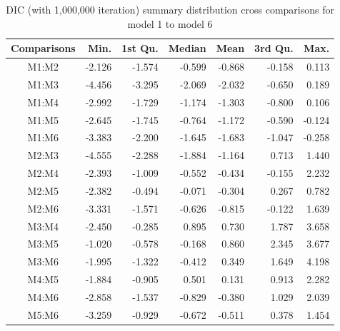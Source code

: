 \begin{table}[ht]
	\centering
	\begin{tabular}{crrrrrr}
		\hline
		Comparisons & Min. & 1st Qu. & Median & Mean & 3rd Qu. & Max. \\ 
		\hline
		M1:M2 & -2.126 & -1.574 & -0.599 & -0.868 & -0.158 & 0.113 \\ 
		M1:M3 & -4.456 & -3.295 & -2.069 & -2.032 & -0.650 & 0.189 \\ 
		M1:M4 & -2.992 & -1.729 & -1.174 & -1.303 & -0.800 & 0.106 \\ 
		M1:M5 & -2.645 & -1.745 & -0.764 & -1.172 & -0.590 & -0.124 \\ 
		M1:M6 & -3.383 & -2.200 & -1.645 & -1.683 & -1.047 & -0.258 \\ 
		M2:M3 & -4.555 & -2.288 & -1.884 & -1.164 & 0.713 & 1.440 \\ 
		M2:M4 & -2.393 & -1.009 & -0.552 & -0.434 & -0.155 & 2.232 \\ 
		M2:M5 & -2.382 & -0.494 & -0.071 & -0.304 & 0.267 & 0.782 \\ 
		M2:M6 & -3.331 & -1.571 & -0.626 & -0.815 & -0.122 & 1.639 \\ 
		M3:M4 & -2.450 & -0.285 & 0.895 & 0.730 & 1.787 & 3.658 \\ 
		M3:M5 & -1.020 & -0.578 & -0.168 & 0.860 & 2.345 & 3.677 \\ 
		M3:M6 & -1.995 & -1.322 & -0.412 & 0.349 & 1.649 & 4.198 \\ 
		M4:M5 & -1.884 & -0.905 & 0.501 & 0.131 & 0.913 & 2.282 \\ 
		M4:M6 & -2.858 & -1.537 & -0.829 & -0.380 & 1.029 & 2.039 \\ 
		M5:M6 & -3.259 & -0.929 & -0.672 & -0.511 & 0.378 & 1.454 \\ 
		\hline
	\end{tabular}
	\caption{DIC (with 1,000,000 iteration) summary distribution cross comparisons for model 1 to model 6} 
	\label{tab:dic1}
\end{table}

\newpage

